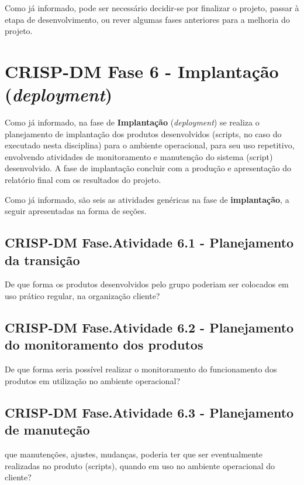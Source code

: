 \documentclass[]{article}
\begin{document}
Como já informado, pode ser necessário decidir-se por finalizar o
projeto, passar à etapa de desenvolvimento, ou rever algumas fases
anteriores para a melhoria do projeto.

\section{\texorpdfstring{CRISP-DM Fase 6 - \textbf{Implantação}
(\emph{deployment})}{CRISP-DM Fase 6 - Implantação (deployment)}}\label{crisp-dm-fase-6---implantacao-deployment}

Como já informado, na fase de \textbf{Implantação} (\emph{deployment})
se realiza o planejamento de implantação dos produtos desenvolvidos
(scripts, no caso do executado nesta disciplina) para o ambiente
operacional, para seu uso repetitivo, envolvendo atividades de
monitoramento e manutenção do sistema (script) desenvolvido. A fase de
implantação concluir com a produção e apresentação do relatório final
com os resultados do projeto.

Como já informado, são seis as atividades genéricas na fase de
\textbf{implantação}, a seguir apresentadas na forma de seções.

\subsection{CRISP-DM Fase.Atividade 6.1 - Planejamento da
transição}\label{crisp-dm-fase.atividade-6.1---planejamento-da-transicao}

De que forma os produtos desenvolvidos pelo grupo poderiam ser colocados
em uso prático regular, na organização cliente?

\subsection{CRISP-DM Fase.Atividade 6.2 - Planejamento do monitoramento
dos
produtos}\label{crisp-dm-fase.atividade-6.2---planejamento-do-monitoramento-dos-produtos}

De que forma seria possível realizar o monitoramento do funcionamento
dos produtos em utilização no ambiente operacional?

\subsection{CRISP-DM Fase.Atividade 6.3 - Planejamento de
manuteção}\label{crisp-dm-fase.atividade-6.3---planejamento-de-manutecao}

que manutenções, ajustes, mudanças, poderia ter que ser eventualmente
realizadas no produto (scripts), quando em uso no ambiente operacional
do cliente?
\end{document}
